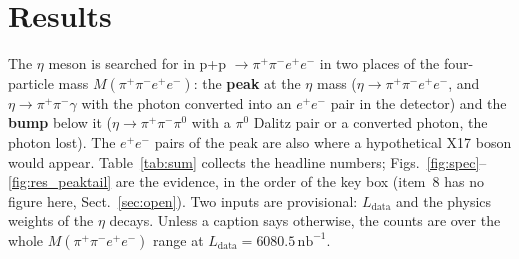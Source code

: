 \documentclass[11pt,a4paper]{article}
\newcommand{\piz}{\ensuremath{\pi^{0}}\xspace}
\newcommand{\ee}{\ensuremath{e^{+}e^{-}}\xspace}
\newcommand{\pipi}{\ensuremath{\pi^{+}\pi^{-}}\xspace}
\newcommand{\ppee}{\ensuremath{\pi^{+}\pi^{-}e^{+}e^{-}}\xspace}
\newcommand{\Mfour}{\ensuremath{M(\pi^{+}\pi^{-}e^{+}e^{-})}\xspace}
\newcommand{\nbinv}{\ensuremath{\mathrm{nb}^{-1}}\xspace}
\newcommand{\Ldata}{\ensuremath{L_{\mathrm{data}}}\xspace}
\begin{document}
\section{Results}
\label{sec:res}
The $\eta$ meson is searched for in p+p $\to\ppee$ in two places of the four-particle mass \Mfour: the \textbf{peak} at
the $\eta$ mass ($\eta\to\ppee$, and $\eta\to\pipi\gamma$ with the photon converted into an \ee pair in the detector)
and the \textbf{bump} below it ($\eta\to\pipi\piz$ with a \piz Dalitz pair or a converted photon, the photon lost).
The \ee pairs of the peak are also where a hypothetical X17 boson would appear. Table~\ref{tab:sum} collects the
headline numbers; Figs.~\ref{fig:spec}--\ref{fig:res_peaktail} are the evidence, in the order of the key box (item~8 has
no figure here, Sect.~\ref{sec:open}). Two inputs are provisional: \Ldata and the physics weights of the $\eta$ decays. Unless a
caption says otherwise, the counts are over the whole \Mfour range at $\Ldata=6080.5\,\nbinv$.
\end{document}
